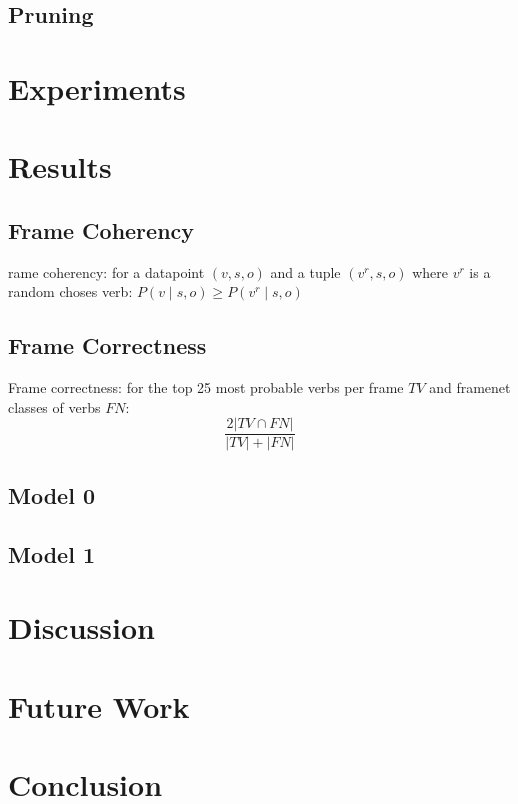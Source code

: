 \documentclass[10pt,twocolumn]{scrartcl}
\begin{document}
\subsection{Pruning}


\section{Experiments}


\section{Results}
\subsection{Frame Coherency}
rame coherency: for a datapoint $(v,s,o)$ and a tuple $(v^r,s,o)$ where $v^r$ is a random choses verb: $P(v\mid s,o) \geq P(v^r\mid s,o)$  
\subsection{Frame Correctness}
Frame correctness: for the top 25 most probable verbs per frame $TV$ and framenet classes of verbs $FN$: \[\frac{2|TV\cap FN|}{|TV|+|FN|}\]
\subsection{Model 0}
\subsection{Model 1}


\section{Discussion}


\section{Future Work}


\section{Conclusion}



\end{document}
